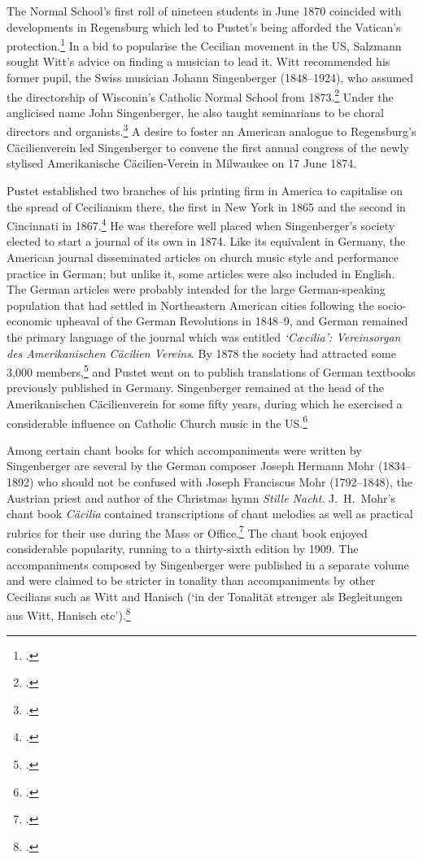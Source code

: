 The Normal School's first roll of nineteen students in June 1870 coincided with \mbox{developments} in Regensburg which led to Pustet's being afforded the Vatican's protection.\footcite[9--10]{DamianHistoricalStudyCaecilian1984}
In a bid to popularise the Cecilian movement in the US, Salzmann sought Witt's advice on finding a musician to lead it.
Witt recommended his former pupil, the Swiss musician Johann Singenberger (1848--1924), who assumed the directorship of Wisconin's Catholic Normal School from 1873.\footcite[6]{GrabrianMilwaukeeWisconsinAmerica1973}
Under the anglicised name John Singenberger, he also taught seminarians to be choral directors and organists.\footcite[167]{JohnsonCrosierFrontierLife1959}
A desire to foster an American analogue to Regensburg's Cäcilienverein led Singenberger to convene the first annual congress of the newly stylised Amerikanische Cäcilien-Verein in Milwaukee on 17 June 1874.

Pustet established two branches of his printing firm in America to capitalise on the spread of Cecilianism there, the first in New York in 1865 and the second in Cincinnati in 1867.\footcites[224]{MuirFullPantingHeart2004}[129]{MuirRomanCatholicChurch2008}
He was therefore well placed when Singenberger's society elected to start a journal of its own in 1874.
Like its equivalent in Germany, the American journal disseminated articles on church music style and performance practice in German; but unlike it, some articles were also included in English.
The German articles were probably intended for the large German-speaking population that had settled in Northeastern American cities following the socio-economic upheaval of the German Revolutions in 1848--9, and German remained the primary language of the journal which was entitled \emph{`Cæcilia': Vereinsorgan des Amerikanischen Cäcilien Vereins}.
By 1878 the society had attracted some 3,000 members,\footcite[220]{OgasapianChurchMusicAmerica2007} and Pustet went on to publish translations of German textbooks previously published in Germany.
Singenberger remained at the head of the Amerikanischen Cäcilienverein for some fifty years, during which he exercised a considerable influence on Catholic Church music in the US.\footcite[1]{BliedThreeArchbishopsMilwaukee1955}

Among certain chant books for which accompaniments were written by Singenberger are several by the German composer Joseph Hermann Mohr (1834--1892) who should not be confused with Joseph Franciscus Mohr (1792--1848), the Austrian priest and author of the Christmas hymn \emph{Stille Nacht}.
J.\ H.\ Mohr's chant book \emph{Cäcilia} contained transcriptions of chant melodies as well as practical rubrics for their use during the Mass or Office.\footcite[notes on p.~231]{MohrCaciliakatholischesGesang1874}
The chant book enjoyed considerable popularity, running to a thirty-sixth edition by 1909.
The accompaniments composed by Singenberger were published in a separate volume and were claimed to be stricter in tonality than accompaniments by other Cecilians such as Witt and Hanisch (`in der Tonalität strenger als Begleitungen aus Witt, Hanisch etc').\footcite[unpaginated `Vorbemerkungen']{SingenbergerOrgelbuchosephMohr1888}

